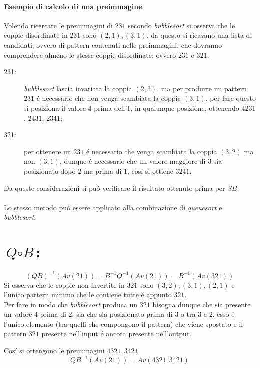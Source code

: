 \paragraph*{Esempio di calcolo di una preimmagine}Volendo ricercare le preimmagini di $231$ secondo \textit{bubblesort} si osserva che le coppie disordinate in $231$ sono $(2,1),(3,1)$, da questo si ricavano una lista di candidati, ovvero di pattern contenuti nelle preimmagini, che dovranno comprendere almeno le stesse coppie disordinate: ovvero $231$ e $321$.
\begin{description}
\item[231:] \textit{bubblesort} lascia invariata la coppia $(2,3)$, ma per produrre un pattern $231$ \'e necessario che non venga scambiata la coppia $(3,1)$, per fare questo si posiziona il valore $4$ prima dell'$1$, in qualunque posizione, ottenendo $4231$, $2431$, $2341$;
\begin{center}
\end{center}
\item[321:] per ottenere un $231$ \'e necessario che venga scambiata la coppia $(3,2)$ ma non $(3,1)$, dunque \'e necessario che un valore maggiore di $3$ sia posizionato dopo $2$ ma prima di $1$, cos\'i si ottiene $3241$.
\begin{center}
\end{center}
\end{description}
Da queste considerazioni si pu\'o verificare il risultato ottenuto prima per $SB$.\\\\
Lo stesso metodo pu\'o essere applicato alla combinazione di \textit{queuesort} e \textit{bubblesort}:
\section*{$\textit{Q}\circ\textit{B}$:}$$(QB)^{-1}(Av(21))=B^{-1}Q^{-1}(Av(21))=B^{-1}(Av(321))$$Si osserva che le coppie non invertite in $321$ sono $(3,2),(3,1),(2,1)$ e l'unico pattern minimo che le contiene tutte \'e appunto $321$.\\Per fare in modo che \textit{bubblesort} produca un $321$ bisogna dunque che sia presente un valore $4$ prima di $2$: sia che sia posizionato prima di $3$ o tra $3$ e $2$, esso \'e l'unico elemento (tra quelli che compongono il pattern) che viene spostato e il pattern $321$ presente nell'input \'e ancora presente nell'output.\\
\begin{center}
\end{center}
Cos\'i si ottengono le preimmagini $4321,3421$.$$QB^{-1}(Av(21))=Av(4321,3421)$$

